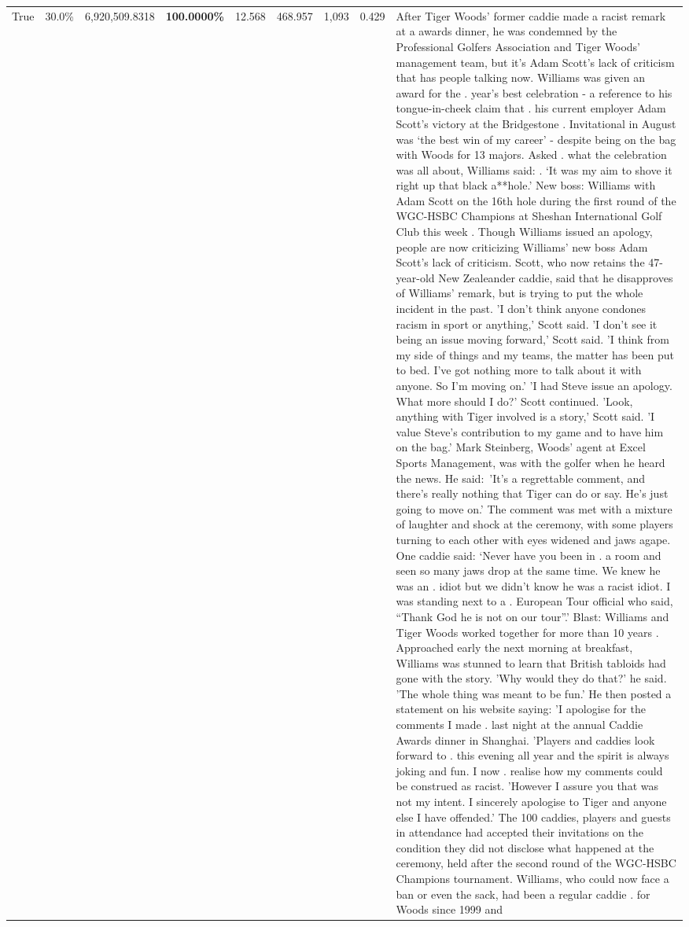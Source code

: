\begin{table}[H]
\begin{tabular}{lllrlllll}
True & 30.0\% & 6,920,509.8318 & \bfseries \color{red} 100.0000\% & 12.568 & 468.957 & 1,093 & 0.429 & After Tiger Woods' former caddie made a racist remark at a awards dinner, he was condemned by the Professional Golfers Association and Tiger Woods' management team, but it's Adam Scott's lack of criticism that has people talking now. Williams was given an award for the . year’s best celebration - a reference to his tongue-in-cheek claim that . his current employer Adam Scott’s victory at the Bridgestone . Invitational in August was ‘the best win of my career’ - despite being on the bag with Woods for 13 majors. Asked . what the celebration was all about, Williams said: . ‘It was my aim to shove it right up that black a**hole.’ New boss: Williams with Adam Scott  on the 16th hole during the first round of the WGC-HSBC Champions at Sheshan International Golf Club this week . Though Williams issued an apology, people are now criticizing Williams' new boss Adam Scott's lack of criticism. Scott, who now retains the 47-year-old New Zealeander caddie, said that he disapproves of Williams' remark, but is trying to put the whole incident in the past. 'I don't think anyone condones racism in sport or anything,' Scott said. 'I don't see it being an issue moving forward,' Scott said. 'I think from my side of things and my teams, the matter has been put to bed. I've got nothing more to talk about it with anyone. So I'm moving on.' 'I had Steve issue an apology. What more should I do?' Scott continued. 'Look, anything with Tiger involved is a story,' Scott said. 'I value Steve's contribution to my game and to have him on the bag.' Mark Steinberg, Woods' agent at Excel Sports Management, was with the golfer when he heard the news. He said: 'It's a regrettable comment, and there's really nothing that Tiger can do or say. He's just going to move on.' The comment was met with a mixture of laughter and shock at the ceremony, with some players turning to each other with eyes widened and jaws agape. One caddie said: ‘Never have you been in . a room and seen so many jaws drop at the same time. We knew he was an . idiot but we didn’t know he was a racist idiot. I was standing next to a . European Tour official who said, “Thank God he is not on our tour”.’ Blast: Williams and Tiger Woods worked together for more than 10 years . Approached early the next morning at breakfast, Williams was stunned to learn that British tabloids had gone with the story. 'Why would they do that?' he said. 'The whole thing was meant to be fun.' He then posted a statement on his website saying: 'I apologise for the comments I made . last night at the annual Caddie Awards dinner in Shanghai. 'Players and caddies look forward to . this evening all year and the spirit is always joking and fun. I now . realise how my comments could be construed as racist. 'However I assure you that was not my intent. I sincerely apologise to Tiger and anyone else I have offended.' The 100 caddies, players and guests in attendance had accepted their invitations on the condition they did not disclose what happened at the ceremony, held after the second round of the WGC-HSBC Champions tournament. Williams, who could now face a ban or even the sack, had been a regular caddie . for Woods since 1999 and 
\end{tabular}
\end{table}
